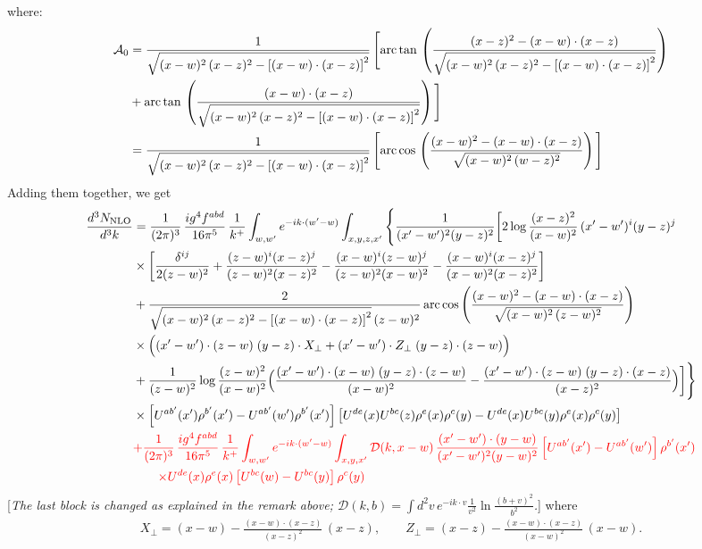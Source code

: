 \documentclass[9pt]{article}
\numberwithin{equation}{section}
\newcommand{\chg}[1]{{\color{red}#1}}
\newcommand{\rnote}[1]{{\color{teal}[\textit{#1}]}}
\begin{document}
where: \begin{align}
\mathcal{A}_{0} & = \frac{1}{\sqrt{(x-w)^{2}\,(x-z)^{2}-\left[(x-w)\cdot (x-z)\right]^{2}}}\, \Bigg[\mathrm{arc\,tan}\,\left(\frac{(x-z)^{2}-(x-w)\cdot (x-z)}{\sqrt{(x-w)^{2}\,(x-z)^{2}-\left[(x-w)\cdot (x-z)\right]^{2}}}\right)\notag \\ & + \mathrm{arc\,tan}\,\left(\frac{(x-w)\cdot (x-z)}{\sqrt{(x-w)^{2}\,(x-z)^{2}-\left[(x-w)\cdot (x-z)\right]^{2}}}\right) \Bigg]\notag \\ & = \frac{1}{\sqrt{(x-w)^{2}\,(x-z)^{2}-\left[(x-w)\cdot (x-z)\right]^{2}}}\, \Bigg[\mathrm{arc\,cos}\,\left(\frac{(x-w)^{2}-(x-w)\cdot (x-z)}{\sqrt{(x-w)^{2}\,(w-z)^{2}}}\right)\Bigg]
\end{align}
Adding them together, we get
\begin{align}
\frac{d^{3}N_{\rm NLO}}{d^{3}k} &=\frac{1}{(2\pi)^{3}}\,\frac{ig^{4}f^{abd}}{16\pi^{5}}\,\frac{1}{k^{+}}\int_{w,w'}e^{-ik\cdot(w'-w)}\int_{x,y,z,x'}\Bigg\{\frac{1}{(x'-w')^{2}(y-z)^{2}}\bigg[2\log\frac{(x-z)^{2}}{(x-w)^{2}}\,(x'-w')^{i}(y-z)^{j}\notag \\
& \times\bigg[\frac{\delta^{ij}}{2(z-w)^{2}}+\frac{(z-w)^{i}(x-z)^{j}}{(z-w)^{2}(x-z)^{2}}-\frac{(x-w)^{i}(z-w)^{j}}{(z-w)^{2}(x-w)^{2}}-\frac{(x-w)^{i}(x-z)^{j}}{(x-w)^{2}(x-z)^{2}}\bigg]\notag \\
& +\frac{2}{\sqrt{(x-w)^{2}\,(x-z)^{2}-\left[(x-w)\cdot (x-z)\right]^{2}}\,(z-w)^{2}}\,\mathrm{arc\,cos}\left(\frac{(x-w)^{2}-(x-w)\cdot (x-z)}{\sqrt{(x-w)^{2}\,(z-w)^{2}}}\right)\notag \\
& \times\Big((x'-w')\cdot(z-w)\;(y-z)\cdot X_{\perp}+(x'-w')\cdot Z_{\perp}\;(y-z)\cdot(z-w)\Big)\notag\\
&+\frac{1}{(z-w)^{2}}\log\frac{(z-w)^{2}}{(x-w)^{2}}\Big(\frac{(x'-w')\cdot(x-w)\;(y-z)\cdot(z-w)}{(x-w)^{2}}-\frac{(x'-w')\cdot(z-w)\;(y-z)\cdot(x-z)}{(x-z)^{2}}\Big)\bigg]\Bigg\}\notag\\
&\times\left[U^{ab'}(x')\rho^{b'}(x')-U^{ab'}(w')\rho^{b'}(x')\right]\left[U^{de}(x)U^{bc}(z)\rho^{e}(x)\rho^{c}(y)-U^{de}(x)U^{bc}(y)\rho^{e}(x)\rho^{c}(y)\right]\notag\\
&\chg{+\frac{1}{(2\pi)^{3}}\,\frac{ig^{4}f^{abd}}{16\pi^{5}}\,\frac{1}{k^{+}}\int_{w,w'}e^{-ik\cdot(w'-w)}\int_{x,y,x'}\mathcal{D}(k,x-w)\,\frac{(x'-w')\cdot(y-w)}{(x'-w')^{2}(y-w)^{2}}\left[U^{ab'}(x')-U^{ab'}(w')\right]\rho^{b'}(x')}\notag\\
&\chg{\qquad\times U^{de}(x)\rho^{e}(x)\left[U^{bc}(w)-U^{bc}(y)\right]\rho^{c}(y)}
\end{align}
\rnote{The last block is changed as explained in the remark above; $\mathcal{D}(k,b)=\int d^{2}v\,e^{-ik\cdot v}\frac{1}{v^{2}}\ln\frac{(b+v)^{2}}{b^{2}}$.}
where
\begin{align}
X_{\perp}=(x-w)-\frac{(x-w)\cdot(x-z)}{(x-z)^{2}}\,(x-z),\qquad
Z_{\perp}=(x-z)-\frac{(x-w)\cdot(x-z)}{(x-w)^{2}}\,(x-w).
\end{align}
\end{document}
